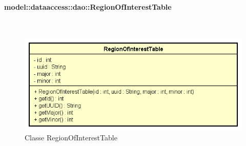\documentclass[../DefinizioneDiProdotto.tex]{subfiles}
\begin{document}
\paragraph{model::dataaccess::dao::RegionOfInterestTable}
\
\begin{figure}[H]
	\centering
	\includegraphics[width=\maxwidth]{img/RegionOfInterestTable.png}
	\caption{Classe RegionOfInterestTable}\label{fig:model::dataaccess::dao::RegionOfInterestTable} 
\end{figure}
\end{document}
